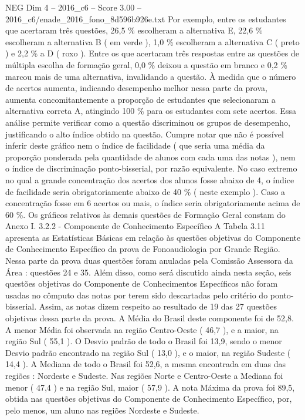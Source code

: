 \begin{textsample}{NEG Dim 4 – 2016\_c6 – Score 3.00 – 2016\_c6/enade\_2016\_fono\_8d596b926e.txt}
Por exemplo, entre os estudantes que acertaram três questões, 26,5 \% escolheram a alternativa E, 22,6 \% escolheram a alternativa B ( em verde ), 1,0 \% escolheram a alternativa C ( preto ) e 2,2 \% a D ( roxo ).
Entre os que acertaram três respostas entre as questões de múltipla escolha de formação geral, 0,0 \% deixou a questão em branco e 0,2 \% marcou mais de uma alternativa, invalidando a questão.
À medida que o número de acertos aumenta, indicando desempenho melhor nessa parte da prova, aumenta concomitantemente a proporção de estudantes que selecionaram a alternativa correta A, atingindo 100 \% para os estudantes com sete acertos.
Essa análise permite verificar como a questão discriminou os grupos de desempenho, justificando o alto índice obtido na questão.
Cumpre notar que não é possível inferir deste gráfico nem o índice de facilidade ( que seria uma média da proporção ponderada pela quantidade de alunos com cada uma das notas ), nem o índice de discriminação ponto-bisserial, por razão equivalente.
No caso extremo no qual a grande concentração dos acertos dos alunos fosse abaixo de 4, o índice de facilidade seria obrigatoriamente abaixo de 40 \% ( neste exemplo ).
Caso a concentração fosse em 6 acertos ou mais, o índice seria obrigatoriamente acima de 60 \%.
Os gráficos relativos às demais questões de Formação Geral constam do Anexo I. 3.2.2 - Componente de Conhecimento Específico A Tabela 3.11 apresenta as Estatísticas Básicas em relação às questões objetivas do Componente de Conhecimento Específico da prova de Fonoaudiologia por Grande Região.
Nessa parte da prova duas questões foram anuladas pela Comissão Assessora da Área : questões 24 e 35.
Além disso, como será discutido ainda nesta seção, seis questões objetivas do Componente de Conhecimentos Específicos não foram usadas no cômputo das notas por terem sido descartadas pelo critério do ponto-bisserial.
Assim, as notas dizem respeito ao resultado de 19 das 27 questões objetivas dessa parte da prova.
A Média do Brasil deste componente foi de 52,8.
A menor Média foi observada na região Centro-Oeste ( 46,7 ), e a maior, na região Sul ( 55,1 ).
O Desvio padrão de todo o Brasil foi 13,9, sendo o menor Desvio padrão encontrado na região Sul ( 13,0 ), e o maior, na região Sudeste ( 14,4 ).
A Mediana de todo o Brasil foi 52,6, a mesma encontrada em duas das regiões : Nordeste e Sudeste.
Nas regiões Norte e Centro-Oeste a Mediana foi menor ( 47,4 ) e na região Sul, maior ( 57,9 ).
A nota Máxima da prova foi 89,5, obtida nas questões objetivas do Componente de Conhecimento Específico, por, pelo menos, um aluno nas regiões Nordeste e Sudeste.

\end{textsample}
